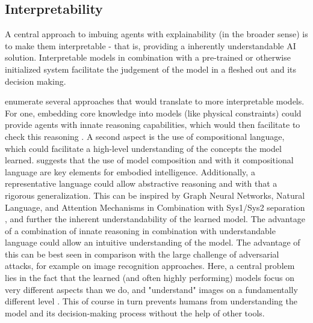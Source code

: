 \documentclass[twoside,11pt]{article}
\begin{document}
\subsection{Interpretability}
\label{subsec:interpretability}

A central approach to imbuing agents with explainability (in the broader sense) is to make them interpretable - that is, providing a inherently understandable AI solution. Interpretable models in combination with a pre-trained or otherwise initialized system facilitate the judgement of the model in a fleshed out and its decision making.

\citet{RoyEtAl:2021:RLRoboticsChallenges} enumerate several approaches that would translate to more interpretable models. For one, embedding core knowledge into models (like physical constraints) could provide agents with innate reasoning capabilities, which would then facilitate to check this reasoning \cite{HaSchmidhuber:2018:CoreKnowledgeWorldModels}. A second aspect is the use of compositional language, which could facilitate a high-level understanding of the concepts the model learned. \cite{Koditschek:2021:RoboticsCompositionalLanguage} suggests that the use of model composition and with it compositional language are key elements for embodied intelligence.
Additionally, a representative language could allow abstractive reasoning and with that a rigorous generalization. This can be inspired by Graph Neural Networks, Natural Language, and Attention Mechanisms in Combination with Sys1/Sys2 separation \cite{RoyEtAl:2021:RLRoboticsChallenges}, and further the inherent understandability of the learned model.
The advantage of a combination of innate reasoning in combination with understandable language could allow an intuitive understanding of the model. The advantage of this can be best seen in comparison with the large challenge of adversarial attacks, for example on image recognition approaches. Here, a central problem lies in the fact that the learned (and often highly performing) models focus on very different aspects than we do, and "understand" images on a fundamentally different level \cite{ChakrabortyEtAl:2021:SurveyAdversarialAttacks}. This of course in turn prevents humans from understanding the model and its decision-making process without the help of other tools.
\end{document}
